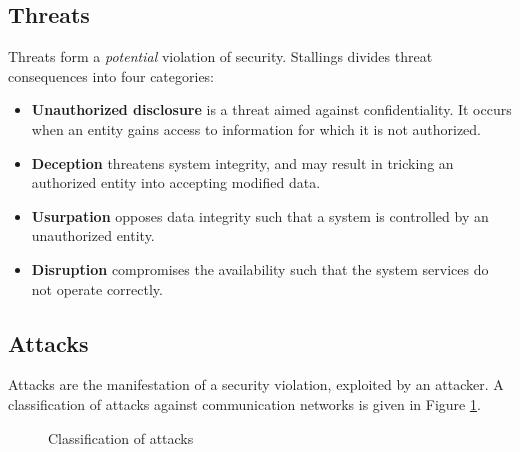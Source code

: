 \subsection{Threats}
Threats form a \textit{potential} violation of security. Stallings \cite{stallingsThreat}
divides threat consequences into four categories:
\begin{itemize}
 \item \textbf{Unauthorized disclosure} is a threat aimed against confidentiality. It occurs when an entity gains access to information for which it is not authorized.
 \item \textbf{Deception} threatens system integrity, and may result in tricking an authorized entity into accepting modified data.
 \item \textbf{Usurpation} opposes data integrity such that a system is controlled by an unauthorized entity.
  \item \textbf{Disruption} compromises the availability such that the system services do not operate correctly.
\end{itemize}

\subsection{Attacks}\label{sec:attacks}
Attacks are the manifestation of a security violation, exploited by an attacker. 
A classification of attacks against communication networks is given in Figure \ref{fig:attacks}.  

\begin{figure}[h]
    \centering
{}
\caption{Classification of attacks}
    \label{fig:attacks}
\end{figure}

